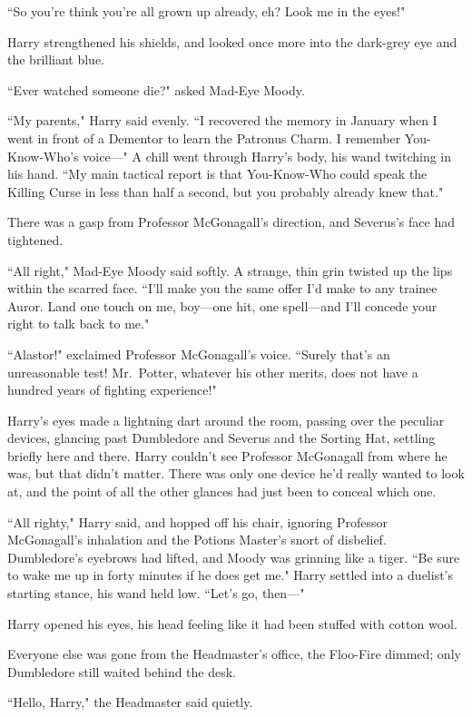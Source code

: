 ``So you're think you're all grown up already, eh? Look me in the eyes!"

Harry strengthened his shields, and looked once more into the dark-grey eye and the brilliant blue.

``Ever watched someone die?" asked Mad-Eye Moody.

``My parents," Harry said evenly. ``I recovered the memory in January when I went in front of a Dementor to learn the Patronus Charm. I remember You-Know-Who's voice—" A chill went through Harry's body, his wand twitching in his hand. ``My main tactical report is that You-Know-Who could speak the Killing Curse in less than half a second, but you probably already knew that."

There was a gasp from Professor McGonagall's direction, and Severus's face had tightened.

``All right," Mad-Eye Moody said softly. A strange, thin grin twisted up the lips within the scarred face. ``I'll make you the same offer I'd make to any trainee Auror. Land one touch on me, boy—one hit, one spell—and I'll concede your right to talk back to me."

``Alastor!" exclaimed Professor McGonagall's voice. ``Surely that's an unreasonable test! Mr.~Potter, whatever his other merits, does not have a hundred years of fighting experience!"

Harry's eyes made a lightning dart around the room, passing over the peculiar devices, glancing past Dumbledore and Severus and the Sorting Hat, settling briefly here and there. Harry couldn't see Professor McGonagall from where he was, but that didn't matter. There was only one device he'd really wanted to look at, and the point of all the other glances had just been to conceal which one.

``All righty," Harry said, and hopped off his chair, ignoring Professor McGonagall's inhalation and the Potions Master's snort of disbelief. Dumbledore's eyebrows had lifted, and Moody was grinning like a tiger. ``Be sure to wake me up in forty minutes if he does get me." Harry settled into a duelist's starting stance, his wand held low. ``Let's go, then—"

\later

Harry opened his eyes, his head feeling like it had been stuffed with cotton wool.

Everyone else was gone from the Headmaster's office, the Floo-Fire dimmed; only Dumbledore still waited behind the desk.

``Hello, Harry," the Headmaster said quietly.

